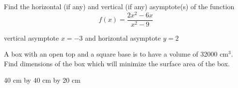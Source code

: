 \documentclass[12pt,letterpaper,addpoints]{exam}
\begin{document}
\begin{questions}
\vfill

\newpage
\addpoints

\question[5] Find the horizontal (if any) and vertical (if any) asymptote(s) of the function $$f(x) = \frac{2x^2-6x}{x^2-9}$$
\begin{solution}
vertical asymptote $x=- 3$ and horizontal asymptote $y=2$
\end{solution}

\vfill

\question[10]
A box with an open top and a square base is to have a volume of 32000 cm$^3$.
Find dimensions of the box which will minimize the surface area of the box.
\begin{solution}
40 cm by 40 cm by 20 cm
\end{solution}
\vfill


\end{questions}
\end{document}
